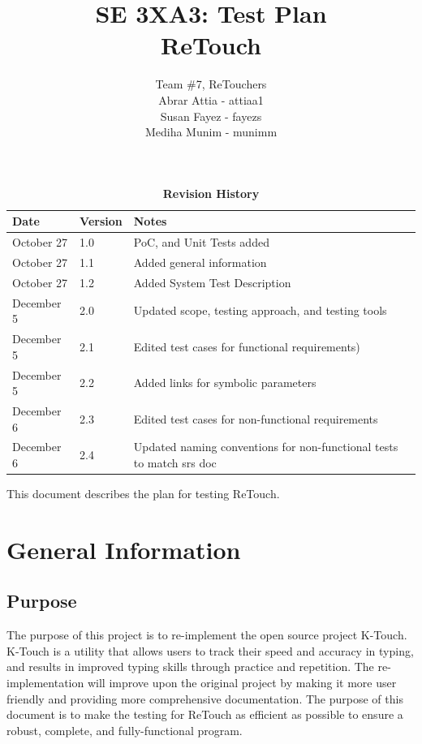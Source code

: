 \documentclass[12pt, titlepage]{article}
\title{SE 3XA3: Test Plan\\ReTouch}
\author{Team \#7, ReTouchers
		\\ Abrar Attia - attiaa1
		\\ Susan Fayez - fayezs
		\\ Mediha Munim - munimm
}
\begin{document}
\maketitle

\tableofcontents
\listoftables
\listoffigures

\begin{table}[htp]
\caption{\bf Revision History}
\begin{tabularx}{\textwidth}{p{3cm}p{2cm}X}
\toprule {\bf Date} & {\bf Version} & {\bf Notes}\\
\midrule
October 27 & 1.0 & PoC, and Unit Tests added\\
October 27 & 1.1 & Added general information\\
October 27 & 1.2 & Added System Test Description\\
December 5 & 2.0 & Updated scope, testing approach, and testing tools\\
December 5 & 2.1 & Edited test cases for functional  requirements)\\
December 5 & 2.2 & Added links for symbolic parameters\\
December 6 & 2.3 & Edited test cases for non-functional requirements\\
December 6 & 2.4 & Updated naming conventions for non-functional tests to match srs doc\\

\bottomrule
\end{tabularx}
\end{table}
\newpage


This document describes the plan for testing ReTouch.

\section{General Information}

\subsection{Purpose}

	The purpose of this project is to re-implement the open source project K-Touch. K-Touch is a utility that allows users to track their speed and accuracy in typing, and results in improved typing skills through practice and repetition. The re-implementation will improve upon the original project by making it more user friendly and providing more comprehensive documentation. The purpose of this document is to make the testing for ReTouch as efficient as possible to ensure a robust, complete, and fully-functional program.
\end{document}
